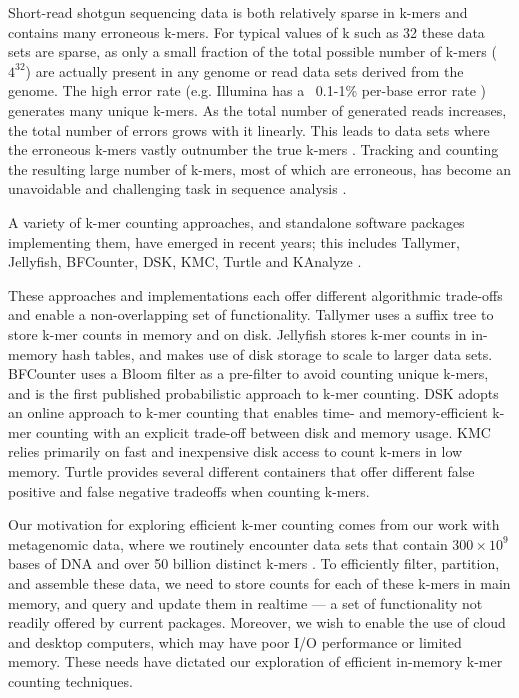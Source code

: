 \documentclass[10pt]{article}
\begin{document}

Short-read shotgun sequencing data is both relatively sparse in k-mers
and contains many erroneous k-mers.  For typical values of k such as
32 these data sets are sparse, as only a small fraction of the total
possible number of k-mers ($4^{32}$) are actually present in any
genome or read data sets derived from the genome.  The high error rate
(e.g. Illumina has a ~0.1-1\% per-base error rate
\cite{pubmed19997069}) generates many unique k-mers.  As the total
number of generated reads increases, the total number of errors grows
with it linearly. This leads to data sets where the erroneous k-mers
vastly outnumber the true k-mers \cite{Conway2011}.  Tracking and
counting the resulting large number of k-mers, most of which are
erroneous, has become an unavoidable and challenging task in sequence
analysis \cite{Minoche2011}.

A variety of k-mer counting approaches, and standalone software
packages implementing them, have emerged in recent years; this
includes Tallymer, Jellyfish, BFCounter, DSK, KMC, Turtle and KAnalyze
\cite{Kurtz2008, Marcais2011, Melsted2011, Rizk2013, Deorowicz2013,
  Roy2014, Audano2014}.

These approaches and implementations each offer different algorithmic
trade-offs and enable a non-overlapping set of functionality.
Tallymer uses a suffix tree to store k-mer counts in memory and on
disk.  Jellyfish stores k-mer counts in in-memory hash tables, and
makes use of disk storage to scale to larger data sets.  BFCounter
uses a Bloom filter as a pre-filter to avoid counting unique k-mers,
and is the first published probabilistic approach to k-mer counting.
DSK adopts an online approach to k-mer counting that enables time- and
memory-efficient k-mer counting with an explicit trade-off between
disk and memory usage.  KMC relies primarily on fast and inexpensive
disk access to count k-mers in low memory.  Turtle provides several
different containers that offer different false positive and false
negative tradeoffs when counting k-mers.

Our motivation for exploring efficient k-mer counting comes from our
work with metagenomic data, where we routinely encounter data sets
that contain $300 \times 10^9$ bases of DNA and over 50 billion
distinct k-mers \cite{Howe2012}.  To efficiently filter, partition,
and assemble these data, we need to store counts for each of these
k-mers in main memory, and query and update them in realtime --- a set
of functionality not readily offered by current packages.  Moreover,
we wish to enable the use of cloud and desktop computers, which may
have poor I/O performance or limited memory. These needs have dictated
our exploration of efficient in-memory k-mer counting techniques.
\end{document}
